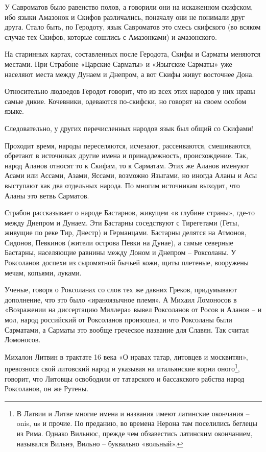У Савроматов было равенство полов, а говорили они на искаженном скифском, ибо языки  Амазонок и Скифов различались, поначалу они не понимали друг друга. Стало быть, по Геродоту, язык Савроматов это смесь скифского (во всяком случае тех Скифов, которые сошлись с Амазонками) и амазонского.

На старинных картах, составленных после Геродота, Скифы и Сарматы меняются местами. При Страбоне  «Царские Сарматы» и «Языгские Сарматы» уже населяют места между Дунаем и Днепром, а вот Скифы живут восточнее Дона.

Относительно людоедов Геродот говорит, что из всех этих народов у них нравы самые дикие. Кочевники, одеваются по-скифски, но говорят на своем особом языке.

Следовательно, у других перечисленных народов язык был общий со Скифами!

Проходит время, народы переселяются, исчезают, рассеиваются, смешиваются, обретают в источниках другие имена и принадлежность, происхождение. Так, народ Аланов относят то к Скифам, то к Сарматам. Этих же Аланов именуют Асами или Ассами, Азами, Яссами, возможно Языгами, но иногда Аланы и Асы выступают как два отдельных народа. По многим источникам выходит, что Аланы это ветвь Сарматов.

Страбон рассказывает о народе Бастарнов, живущем «в глубине страны», где-то между Днепром и Дунаем. Эти Бастарны соседствуют с Тирегетами (Геты, живущие по реке Тир, Днестр) и Германцами. Бастарны делятся на Атмонов, Сидонов, Певкинов (жители острова Певки на Дунае), а самые северные Бастарны, населяющие равнины между Доном и Днепром – Роксоланы. У Роксоланов доспехи из сыромятной бычьей кожи, щиты плетеные, вооружены мечам, копьями, луками.

Ученые, говоря о Роксоланах со слов тех же давних Греков, придумывают дополнение, что это было «ираноязычное племя». А Михаил Ломоносов в «Возражении на диссертацию Миллера» вывел Роксоланов от Росов и Аланов – и мол, народ российский от Роксоланов произошел, и что Роксоланы были Сарматами, а Сарматы это вообще греческое название для Славян. Так считал Ломоносов.

Михалон Литвин в трактате 16 века «О нравах татар, литовцев и москвитян»\cite{litvin}, превознося свой литовский народ и указывая на итальянские корни оного\footnote{В Латвии и Литве многие имена и названия имеют латинские окончания – onis, us и прочие. По преданию, во времена Нерона там поселились беглецы из Рима. Однако Вильнюс, прежде чем обзавестись латинским окончанием, назывался Вильнэ, Вильно – буквально «вольный».}, говорит, что Литовцы освободили от татарского и бассакского рабства народ Роксоланов, он же Рутены.

